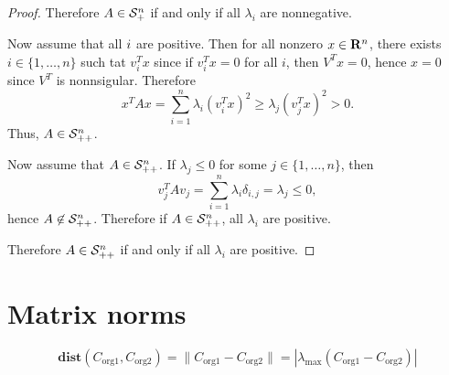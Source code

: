 \begin{itemize}
\begin{proof}
Therefore $A\in\mathcal{S}_+^{n}$ if and only if all $\lambda_i$ are nonnegative.

Now assume that all $\label_i$ are positive.
Then for all nonzero $x\in\mathbf{R}^n$,
there exists $i\in\{1,\ldots,n\}$ such tat $v_i^Tx$
since if $v_i^Tx=0$ for all $i$, then
$V^T x = 0$, hence $x=0$ since $V^T$ is nonnsigular.
Therefore
\begin{equation}
x^T A x = \sum_{i=1}^n \lambda_i (v_i^T x)^2
\geq \lambda_j (v_j^T x)^2 > 0.
\end{equation}
Thus, $A\in\mathcal{S}_{++}^{n}$.

Now assume that $A\in\mathcal{S}_{++}^{n}$.
If $\lambda_j \leq 0$ for some $j\in\{1,\ldots,n\}$,
then
\begin{equation}
v_j^T A v_j
= \sum_{i=1}^n \lambda_i \delta_{i,j}
= \lambda_j \leq 0,
\end{equation}
hence $A\not\in\mathcal{S}_{++}^{n}$. Therefore if $A\in\mathcal{S}_{++}^{n}$, all $\lambda_i$ are positive.

Therefore $A\in\mathcal{S}_{++}^{n}$ if and only if all $\lambda_i$ are positive.

\end{proof}

\end{itemize}

\section{Matrix norms}

\begin{equation}
\mathbf{dist}( C_\mathrm{org 1}, C_\mathrm{org 2} ) = 
\|C_\mathrm{org 1} - C_\mathrm{org 2} \|
= |\lambda_\mathrm{max}(C_\mathrm{org 1} - C_\mathrm{org 2})|
\end{equation}
